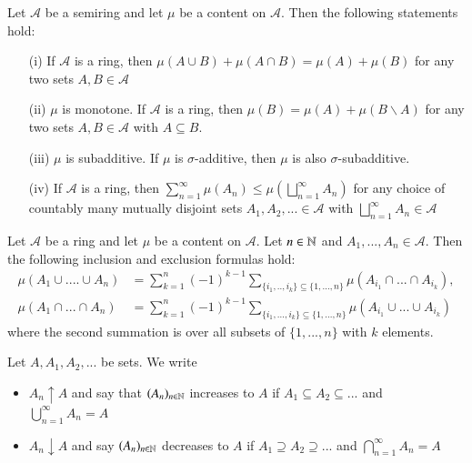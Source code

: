 \documentclass[12pt, a4paper, oneside, openright, titlepage]{book}
\begin{document}
\begin{lem}
    Let $\mathcal{A}$ be a semiring and let $\mu$ be a content on $\mathcal{A}$. Then the following statements hold: \begin{itemize}
        \item[(i)] If $\mathcal{A}$ is a ring, then $\mu(A\cup B) + \mu(A\cap B) = \mu(A) + \mu(B)$ for any two sets $A,B \in \mathcal{A}$
        \item[(ii)] $\mu$ is monotone. If $\mathcal{A}$ is a ring, then $\mu(B) = \mu(A) + \mu(B\backslash A)$ for any two sets $A,B \in \mathcal{A}$ with $A\subseteq B$.
        \item[(iii)] $\mu$ is subadditive. If $\mu$ is $\sigma$-additive, then $\mu$ is also $\sigma$-subadditive.
        \item[(iv)] If $\mathcal{A}$ is a ring, then $\sum_{n=1}^{\infty}\mu(A_n) \leq \mu\left(\bigsqcup_{n=1}^{\infty}A_n\right)$ for any choice of countably many mutually disjoint sets $A_1,A_2,... \in \mathcal{A}$ with $\bigsqcup_{n=1}^{\infty}A_n \in \mathcal{A}$
    \end{itemize}
\end{lem}


\begin{thm}
    Let $\mathcal{A}$ be a ring and let $\mu$ be a content on $\mathcal{A}$. Let $n \in \mathbb N$ and $A_1,...,A_n \in \mathcal{A}$. Then the following inclusion and exclusion formulas hold: \begin{align*}
        \mu(A_1\cup....\cup A_n) &= \sum_{k=1}^n(-1)^{k-1}\sum_{\{i_1,..,i_k\}\subseteq \{1,...,n\}}\mu(A_{i_1}\cap...\cap A_{i_k}), \\
        \mu(A_1\cap ...\cap A_n) &= \sum_{k=1}^n(-1)^{k-1}\sum_{\{i_1,...,i_k\}\subseteq \{1,...,n\}}\mu(A_{i_1}\cup...\cup A_{i_k})
    \end{align*}
    where the second summation is over all subsets of $\{1,...,n\}$ with $k$ elements.
\end{thm}


\begin{defn}
    Let $A,A_1,A_2,...$ be sets. We write \begin{itemize}
        \item $A_n\uparrow A$ and say that $(A_n)_{n\in \mathbb N}$ increases to $A$ if $A_1\subseteq A_2\subseteq ...$ and $\bigcup_{n=1}^{\infty}A_n = A$
        \item $A_n\downarrow A$ and say $(A_n)_{n\in \mathbb N}$ decreases to $A$ if $A_1\supseteq A_2\supseteq ...$ and $\bigcap_{n=1}^{\infty}A_n = A$
    \end{itemize}
\end{defn}
\end{document}
